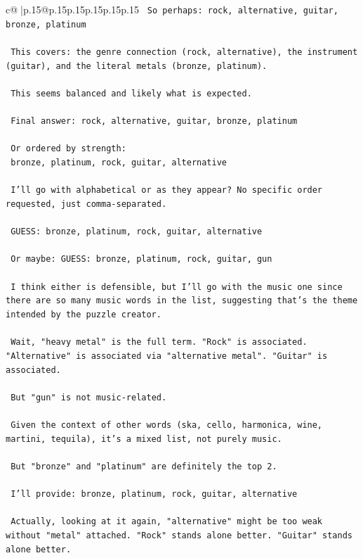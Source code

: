 \documentclass{article}
\begin{document}
{\begin{supertabular}{c@{$\;$}|p{.15\linewidth}@{}p{.15\linewidth}p{.15\linewidth}p{.15\linewidth}p{.15\linewidth}p{.15\linewidth}}
{{{\texttt{ So perhaps: rock, alternative, guitar, bronze, platinum} \\
\\ 
\texttt{ This covers: the genre connection (rock, alternative), the instrument (guitar), and the literal metals (bronze, platinum).} \\
\\ 
\texttt{ This seems balanced and likely what is expected.} \\
\\ 
\texttt{ Final answer: rock, alternative, guitar, bronze, platinum} \\
\\ 
\texttt{ Or ordered by strength:} \\
\texttt{ bronze, platinum, rock, guitar, alternative} \\
\\ 
\texttt{ I'll go with alphabetical or as they appear? No specific order requested, just comma{-}separated.} \\
\\ 
\texttt{ GUESS: bronze, platinum, rock, guitar, alternative} \\
\\ 
\texttt{ Or maybe: GUESS: bronze, platinum, rock, guitar, gun} \\
\\ 
\texttt{ I think either is defensible, but I'll go with the music one since there are so many music words in the list, suggesting that's the theme intended by the puzzle creator.} \\
\\ 
\texttt{ Wait, "heavy metal" is the full term. "Rock" is associated. "Alternative" is associated via "alternative metal". "Guitar" is associated.} \\
\\ 
\texttt{ But "gun" is not music{-}related.} \\
\\ 
\texttt{ Given the context of other words (ska, cello, harmonica, wine, martini, tequila), it's a mixed list, not purely music.} \\
\\ 
\texttt{ But "bronze" and "platinum" are definitely the top 2.} \\
\\ 
\texttt{ I'll provide: bronze, platinum, rock, guitar, alternative} \\
\\ 
\texttt{ Actually, looking at it again, "alternative" might be too weak without "metal" attached. "Rock" stands alone better. "Guitar" stands alone better.} \\
}}}
\end{supertabular}}
\end{document}
